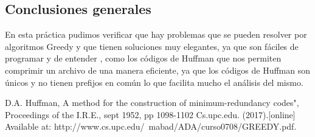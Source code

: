 \documentclass[12pt,twoside]{article}
\begin{document}
\subsection{Conclusiones generales}
    	En esta práctica pudimos verificar que hay problemas que se pueden resolver por algoritmos Greedy y que tienen soluciones muy elegantes, ya que son fáciles de programar y de entender , como los códigos de Huffman que nos permiten comprimir un archivo de una manera eficiente, ya que los códigos de Huffman son únicos y no tienen prefijos en común lo que facilita mucho el análisis del mismo.

\begin{thebibliography}{9}
  D.A. Huffman, A method for the construction of minimum-redundancy codes", Proceedings of the I.R.E., sept 1952, pp 1098-1102
 Cs.upc.edu. (2017).[online] Available at: http://www.cs.upc.edu/~mabad/ADA/curso0708/GREEDY.pdf.
\end{thebibliography}
\end{document}
